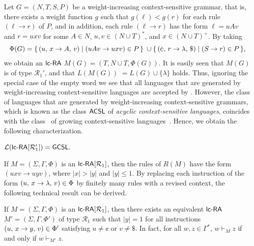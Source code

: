 Let $G=(N,T,S,P)$ be a weight-increasing context-sensitive grammar, that is, there exists a weight function $g$ such that $g(\ell) < g(r)$ for each rule $(\ell\to r)$ of $P$, and in addition, each rule $(\ell\to r)$ has the form $\ell=uAv$ and $r=uxv$ for some $A\in N$, $u,v\in(N\cup T)^*$, and $x\in (N\cup T)^+$. By taking
$$\Phi(G)  =  \{\,\rarule{u}{x}{A}{v} \mid (uAv\to uxv)\in P\,\}\; \cup
              \{\,\rarule{\cent}{r}{\lambda}{\$} \mid (S\to r)\in P\,\},$$
we obtain an $\lcRA$ $M(G) = (T,N\cup T,\Phi(G))$. It is easily seen that $M(G)$ is of type $\mathcal{R}_1'$, and that $L(M(G))$ $ = L(G)\cup\{\lambda\}$ holds. Thus, ignoring the special case of the empty word we see that all languages that are generated by weight-increasing context-sensitive languages are accepted by \lcRAp[1]. However, the class of languages that are generated by weight-increasing context-sensitive grammars, which is known as the class $\textup{\sf ACSL}$ of \emph{acyclic context-sensitive languages}, coincides with the class \GCSL\ of growing context-sensitive languages~\cite{NiWo01}. Hence, we obtain the following characterization.

\begin{theorem}\label{PropR1a}
${\mathcal L}(\lcRAp[1]) =  \GCSL.$
\end{theorem}

If $M = (\Sigma,\Gamma,\Phi)$ is an $\lcRA[1]$, then the rules of $R(M)$ have the form $(uxv \to uyv)$, where $|x|>|y|$ and $|y|\le 1$. By replacing each instruction of the form $(u,\,x\rightarrow\lambda,\,v)\in \Phi$ by finitely many rules with a revised context, the following technical result can be derived.

\begin{lemma}\label{LemR1a}
If $M = (\Sigma,\Gamma,\Phi)$ is an $\lcRA[1]$, then there exists an equivalent $\lcRA$ $M'=(\Sigma,\Gamma,\Phi')$ of type $\mathcal{R}_1$ such that $|y|=1$ for all instructions $(u,\,x\rightarrow y,\,v)\in \Phi'$ satisfying $u\not=\cent$ or $v\not=\$$. In fact, for all $w,z\in \Gamma^*$, $w\vdash_M z$ if and only if $w\vdash_{M'} z$.
\end{lemma}

